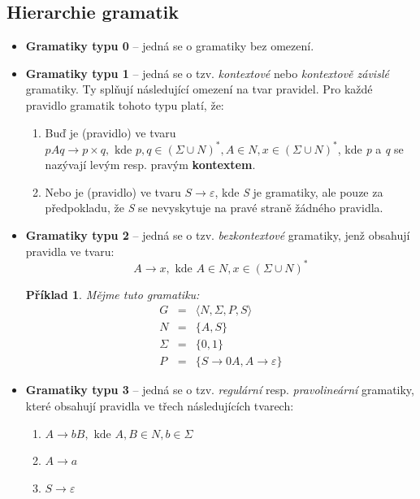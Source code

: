 \documentclass[10pt, a4paper, titlepage]{article}
\theoremstyle{note}
\newtheorem{priklad}{\textbf{Příklad}}
\begin{document}
\subsection{Hierarchie gramatik}
\begin{itemize}
\item
\textbf{Gramatiky typu 0} -- jedná se o gramatiky bez omezení.

\item
\textbf{Gramatiky typu 1} -- jedná se o tzv. \emph{kontextové} nebo \emph{kontextově závislé} gramatiky.
Ty splňují následující omezení na tvar pravidel. Pro každé pravidlo gramatik tohoto typu platí, že:
\begin{enumerate}
\item
Buď je (pravidlo) ve tvaru $pAq \rightarrow p \times q, \text{ kde } p, q \in (\Sigma \cup N)^{*}, A \in N, x \in (\Sigma \cup N)^{*}$, kde \emph{p} a \emph{q}
se nazývají levým resp. pravým \textbf{kontextem}.

\item
Nebo je (pravidlo) ve tvaru $S \rightarrow \varepsilon$, kde \emph{S} je  gramatiky, ale pouze
za předpokladu, že \emph{S} se nevyskytuje na pravé straně žádného pravidla.
\end{enumerate}

\item
\textbf{Gramatiky typu 2} -- jedná se o tzv. \emph{bezkontextové} gramatiky, jenž obsahují pravidla ve tvaru:
$$
A \rightarrow x, \text{ kde } A \in N, x \in (\Sigma \cup N)^{*}
$$

\begin{priklad}
Mějme tuto gramatiku:
\begin{eqnarray*}
G &=& \langle N, \Sigma, P, S \rangle \\
N &=& \lbrace A, S \rbrace \\
\Sigma &=& \lbrace 0, 1 \rbrace \\
P &=& \lbrace S \rightarrow 0A, A \rightarrow \varepsilon \rbrace
\end{eqnarray*}
\end{priklad}

\item
\textbf{Gramatiky typu 3} -- jedná se o tzv. \emph{regulární} resp. \emph{pravolineární} gramatiky, které obsahují pravidla ve třech následujících tvarech:

\begin{enumerate}
\item
$A \rightarrow bB, \text{ kde } A,B \in N, b \in \Sigma $

\item
$A \rightarrow a$

\item
$S \rightarrow \varepsilon$
\end{enumerate}

\end{itemize}
\end{document}
